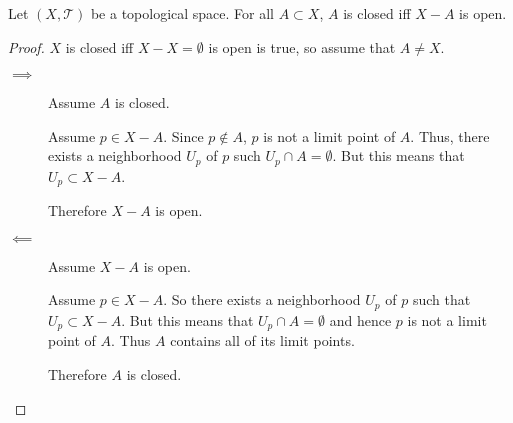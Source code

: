 \documentclass[letterpaper,12pt,fleqn]{article}
\newcommand{\T}{\mathscr{T}}
\begin{document}
\begin{theorem}[2.14]
  Let \((X,\T)\) be a topological space.  For all \(A\subset X\), \(A\) is closed iff \(X-A\) is open.
\end{theorem}

\begin{proof}
  \(X\) is closed iff \(X-X=\emptyset\) is open is true, so assume that \(A\ne X\).

  \begin{description}
  \item[\(\implies\)] Assume \(A\) is closed.

    Assume \(p\in X-A\).  Since \(p\notin A\), \(p\) is not a limit point of \(A\).  Thus, there exists a neighborhood
    \(U_p\) of \(p\) such \(U_p\cap A=\emptyset\).  But this means that \(U_p\subset X-A\).

    Therefore \(X-A\) is open.

  \item[\(\impliedby\)] Assume \(X-A\) is open.

    Assume \(p\in X-A\).  So there exists a neighborhood \(U_p\) of \(p\) such that \(U_p\subset X-A\).  But this
    means that \(U_p\cap A=\emptyset\) and hence \(p\) is not a limit point of \(A\).  Thus \(A\) contains all of
    its limit points.

    Therefore \(A\) is closed.
  \end{description}
\end{proof}
\end{document}
